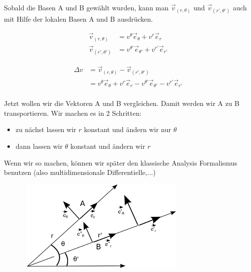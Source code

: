 Sobald die Basen A und B gewählt wurden, kann man $ \overrightarrow{v}_{(r,\theta)} $ und $ \overrightarrow{v}_{(r',\theta')} $ auch mit Hilfe der lokalen Basen A und B ausdrücken.

\begin{align*}
	\overrightarrow{v}_{(r,\theta)} &= v^{\theta} \overrightarrow{e}_{\theta} + 
	                                   v^{r} \overrightarrow{e}_{r}                \\
	\overrightarrow{v}_{(r',\theta')} &= v^{\theta'} \overrightarrow{e}_{\theta'} + 
	                                     v^{r'} \overrightarrow{e}_{r'}
\end{align*} 
 
\begin{align*}
	\Delta v &=   \overrightarrow{v}_{(r,\theta)} - \overrightarrow{v}_{(r',\theta')}\\
			&=  v^{\theta} \overrightarrow{e}_{\theta} + v^{r} \overrightarrow{e}_{r}  - v^{\theta'} \overrightarrow{e}_{\theta'} - v^{r'} \overrightarrow{e}_{r'}   \\
\end{align*} 

Jetzt wollen wir die Vektoren A und B vergleichen. Damit werden wir A zu B transportieren. Wir machen es in 2 Schritten:
\begin{itemize}
\item zu nächst lassen wir $r$ konstant und ändern wir nur $\theta$
\item dann lassen wir $\theta$ konstant und ändern wir $r$
\end{itemize}
Wenn wir so machen, können wir später den klassische Analysis Formalismus benutzen (also multidimensionale Differentielle,...)

\begin{figure}
  \centering
  \mbox{
    \includegraphics[width=8cm]{img/Christoffel-Zeichnung -Verschiebung theta.png}
  }
    \captionsetup{singlelinecheck=off}
    \label{fig:Verschiebung Teil 1}
\end{figure}


